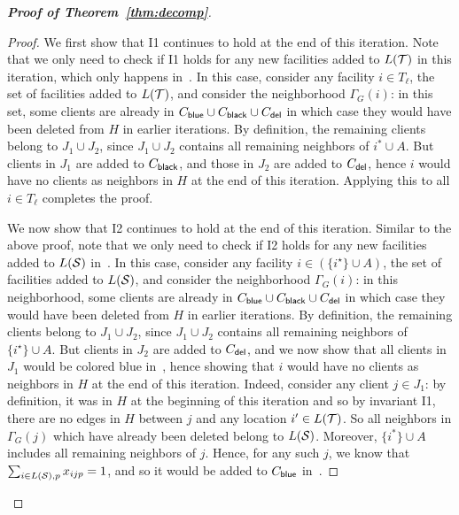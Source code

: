 \begin{proof}[{\bf Proof of Theorem~\ref{thm:decomp}}]
\begin{proof}
\medskip \noindent We first show that I1 continues to hold at the end of this iteration. Note that we only need to check if I1 holds for any new facilities added to $L({\cal T})$ in this iteration, which only happens in~. In this case, consider any facility $i \in T_\ell$, the set of facilities added to $L({\cal T})$, and consider the neighborhood $\Gamma_G(i)$: in this set, some clients are already in $C_{\mathsf{blue}} \cup C_{\mathsf{black}} \cup C_{\mathsf{del}}$ in which case they would have been deleted from $H$ in earlier iterations. By definition, the remaining clients belong to $J_1 \cup J_2$, since $J_1 \cup J_2$ contains all remaining neighbors of $i^* \cup A$. But clients in $J_1$ are added to $C_{\mathsf{black}}$, and those in $J_2$ are added to $C_{\mathsf{del}}$, hence $i$ would have no  clients as neighbors in $H$ at the end of this iteration. Applying this to all $i \in T_\ell$ completes the proof.

\medskip \noindent We now show that I2 continues to hold at the end of this iteration. Similar to the above proof, note that we only need to check if I2 holds for any new facilities added to $L({\cal S})$ in~. In this case, consider any facility $i \in (\{i^\star\} \cup A)$, the set of facilities added to $L({\cal S})$, and consider the neighborhood $\Gamma_G(i)$: in this neighborhood, some clients are already in $C_{\mathsf{blue}} \cup C_{\mathsf{black}} \cup C_{\mathsf{del}}$ in which case they would have been deleted from $H$ in earlier iterations. By definition, the remaining clients belong to $J_1 \cup J_2$, since $J_1 \cup J_2$ contains all remaining neighbors of $\{i^\star \} \cup A$. But clients in $J_2$ are added to $C_{\mathsf{del}}$, and we now show that all clients in $J_1$ would be colored blue in~, hence showing that $i$ would have no clients as neighbors in $H$ at the end of this iteration.
Indeed, consider any client $j \in J_1$: by definition, it was in $H$ at the beginning of this iteration and so by invariant I1, there are no edges in $H$ between $j$ and any location $i' \in L({\cal T})$. So all neighbors in $\Gamma_G(j)$ which have already been deleted belong to $L({\cal S})$. Moreover, $\{i^*\} \cup A$ includes all remaining neighbors of $j$. Hence, for any such $j$, we know that $\sum_{i \in L({\cal S}), p} x_{ijp} = 1$, and so it would be
added to $C_{\mathsf{blue}}$ in~.
\end{proof}


\end{proof}
